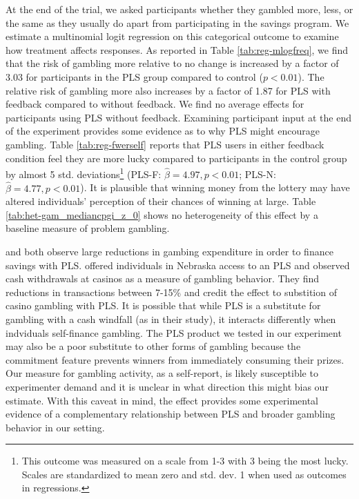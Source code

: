\documentclass[12pt, titlepage]{article}
\begin{document}
		At the end of the trial, we asked participants whether they gambled more, less, or the same as they usually do apart from participating in the savings program. We estimate a multinomial logit regression on this categorical outcome to examine how treatment affects responses. As reported in Table \ref{tab:reg-mlogfreq}, we find that the risk of gambling more relative to no change is increased by a factor of 3.03 for participants in the PLS group compared to control ($p < 0.01$). The relative risk of gambling more also increases by a factor of 1.87 for PLS with feedback compared to without feedback. We find no average effects for participants using PLS without feedback. Examining participant input at the end of the experiment provides some evidence as to why PLS might encourage gambling. Table \ref{tab:reg-fwerself} reports that PLS users in either feedback condition feel they are more lucky compared to participants in the control group by almost 5 std. deviations\footnote{This outcome was measured on a scale from 1-3 with 3 being the most lucky. Scales are standardized to mean zero and std. dev. 1 when used as outcomes in regressions.} (PLS-F: $\hat \beta = 4.97, p < 0.01$; PLS-N: $\hat \beta = 4.77, p < 0.01$). It is plausible that winning money from the lottery may have altered individuals' perception of their chances of winning at large. Table \ref{tab:het-gam_mediancpgi_z_0} shows no heterogeneity of this effect by a baseline measure of problem gambling.

		\textcite{atalay_savings_2014} and \textcite{dizon_leveraging_2016} both observe large reductions in gambing expenditure in order to finance savings with PLS. \textcite{cookson_when_2016} offered individuals in Nebraska access to an PLS and observed cash withdrawals at casinos as a measure of gambling behavior. They find reductions in transactions between 7-15\% and credit the effect to substition of casino gambling with PLS. It is possible that while PLS is a substitute for gambling with a cash windfall (as in their study), it interacts differently when indviduals self-finance gambling. The PLS product we tested in our experiment may also be a poor substitute to other forms of gambling because the commitment feature prevents winners from immediately consuming their prizes. Our measure for gambling activity, as a self-report, is likely susceptible to experimenter demand and it is unclear in what direction this might bias our estimate. With this caveat in mind, the effect provides some experimental evidence of a complementary relationship between PLS and broader gambling behavior in our setting.
\end{document}
